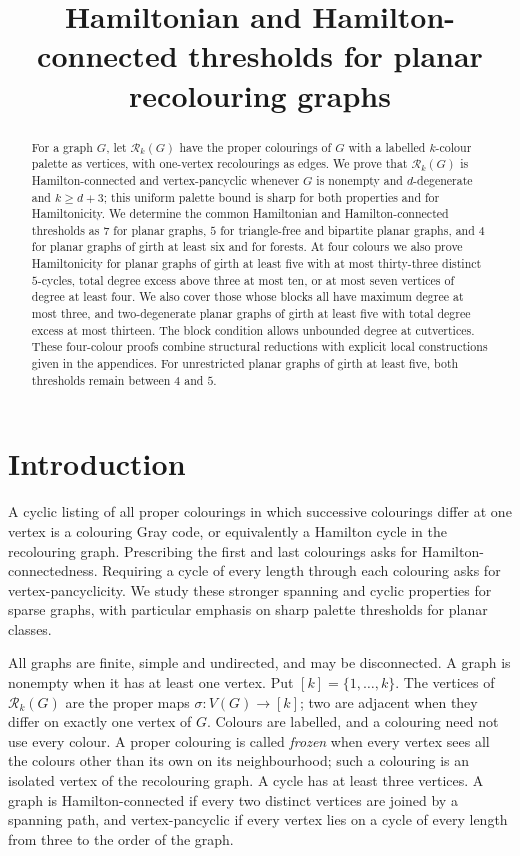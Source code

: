 \documentclass[11pt]{article}
\title{Hamiltonian and Hamilton-connected thresholds for planar recolouring graphs}
\author{}
\date{}
\theoremstyle{remark}
\newcommand{\Rk}{\mathcal R_k}
\numberwithin{equation}{section}
\numberwithin{table}{section}
\begin{document}
\maketitle

\begin{abstract}
For a graph $G$, let $\Rk(G)$ have the proper colourings of $G$ with a
labelled $k$-colour palette as vertices, with one-vertex recolourings as
edges. We prove that $\Rk(G)$ is Hamilton-connected and vertex-pancyclic
whenever $G$ is nonempty and $d$-degenerate and $k\ge d+3$; this uniform
palette bound is sharp for both properties and for Hamiltonicity. We determine the common
Hamiltonian and Hamilton-connected thresholds as $7$ for planar graphs,
$5$ for triangle-free and bipartite planar graphs, and $4$ for planar
graphs of girth at least six and for forests. At four colours we also
prove Hamiltonicity for planar graphs of girth at least five with at
most thirty-three distinct $5$-cycles, total degree excess above three
at most ten, or at most seven vertices of degree at least four. We
also cover those whose blocks all have maximum degree at most three,
and two-degenerate planar graphs of girth at least five with total
degree excess at most thirteen.
The block condition allows unbounded degree at cutvertices.
These four-colour proofs combine structural
reductions with explicit local constructions given in the appendices. For unrestricted planar graphs of girth at
least five, both thresholds remain between $4$ and $5$.
\end{abstract}

\section{Introduction}

A cyclic listing of all proper colourings in which successive colourings
differ at one vertex is a colouring Gray code, or equivalently a Hamilton
cycle in the recolouring graph. Prescribing the first and last
colourings asks for Hamilton-connectedness. Requiring a cycle of every
length through each colouring asks for vertex-pancyclicity. We study
these stronger spanning and cyclic properties for sparse graphs, with
particular emphasis on sharp palette thresholds for planar classes.

All graphs are finite, simple and undirected, and may be disconnected.
A graph is nonempty when it has at least one vertex. Put $[k]=\{1,\ldots,k\}$.
The vertices of $\Rk(G)$ are the proper maps $\sigma:V(G)\to[k]$;
two are adjacent when they differ on exactly one vertex of $G$.
Colours are labelled, and a colouring need not use every colour.
A proper colouring is called \emph{frozen} when every vertex sees all
the colours other than its own on its neighbourhood; such a colouring
is an isolated vertex of the recolouring graph.
A cycle has at least three vertices. A graph is Hamilton-connected if
every two distinct vertices are joined by a spanning path, and
vertex-pancyclic if every vertex lies on a cycle of every length from
three to the order of the graph.
\end{document}
